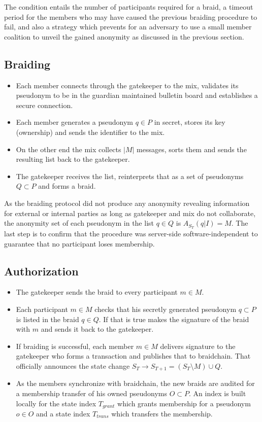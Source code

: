 \documentclass[12pt]{article}
\begin{document}
The condition entails the number of participants required for a braid, a timeout period for the members who may have caused the previous braiding procedure to fail, and also a strategy which prevents for an adversary to use a small member coalition to unveil the gained anonymity as discussed in the previous section.

\subsection*{Braiding}

\begin{itemize}
\item Each member connects through the gatekeeper to the mix, validates its pseudonym to be in the guardian maintained bulletin board and establishes a secure connection.
\item Each member generates a pseudonym $q \in P$ in secret, stores its key (ownership) and sends the identifier to the mix.
\item On the other end the mix collects $|M|$ messages, sorts them and sends the resulting list back to the gatekeeper.
\item The gatekeeper receives the list, reinterprets that as a set of pseudonyms $Q \subset P$ and forms a braid.
\end{itemize}

As the braiding protocol did not produce any anonymity revealing information for external or internal parties as long as gatekeeper and mix do not collaborate, the anonymity set of each pseudonym in the list $q \in Q$ is $A_{S_T}(q|I) = M$. The last step is to confirm that the procedure was server-side software-independent to guarantee that no participant loses membership.

\subsection*{Authorization}

\begin{itemize}
\item The gatekeeper sends the braid to every participant $m \in M$.
\item Each participant $m \in M$ checks that his secretly generated pseudonym $q \subset P$ is listed in the braid $q \in Q$. If that is true makes the signature of the braid with $m$ and sends it back to the gatekeeper.
\item If braiding is successful, each member $m \in M$ delivers signature to the gatekeeper who forms a transaction and publishes that to braidchain. That officially announces the state change $S_T \to S_{T+1} = (S_T \setminus M) \cup Q$.
\item As the members synchronize with braidchain, the new braids are audited for a membership transfer of his owned pseudonyms $O \subset P$. An index is built locally for the state index $T_{grant}$ which grants membership for a pseudonym $o \in O$ and a state index $T_{trans}$ which transfers the membership. 
\end{itemize}
\end{document}
